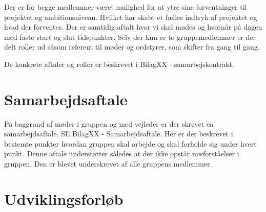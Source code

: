 Der er for begge medlemmer været mulighed for at ytre sine forventninger til projektet og ambitionsniveau. Hvilket har skabt et fælles indtryk af projektet og hvad der forventes. Der er samtidig aftalt hvor vi skal mødes og hvornår på dagen med faste start og slut tidspunkter. Selv der  kun er to gruppemedlemmer er der delt roller ud såsom referent til møder og ordstyrer, som skifter fra gang til gang.

De konkrete aftaler og roller er beskrevet i BilagXX - samarbejskontrakt. 

\chapter{Samarbejdsaftale}
På baggrund af møder i gruppen og med vejleder er der skrevet en samarbejdsaftale. SE BilagXX - Samarbejdsaftale. Her er der beskrevet i bestemte punkter hvordan gruppen skal  arbejde og skal forholde sig under hvert punkt. Denne aftale understøtter således at der ikke opstår misforståelser i gruppen. Den er blevet underskrevet af alle gruppens medlemmer.  


\chapter{Udviklingsforløb}


